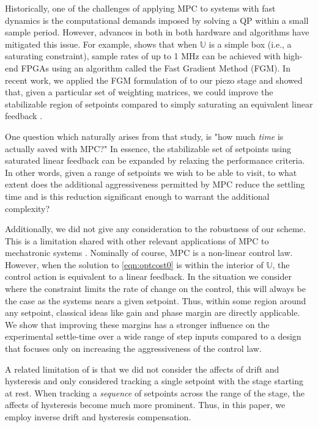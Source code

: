 \documentclass[journal,twocolumn,twoside]{IEEEtran}
\begin{document}
Historically, one of the challenges of applying MPC to systems with fast dynamics is the computational demands imposed by solving a QP within a small sample period. However, advances in both in both hardware and algorithms have mitigated this issue. For example, \cite{Jerez_Trans_2014} shows that when $\mathds{U}$ is a simple box (i.e., a saturating constraint), sample rates of up to 1 MHz can be achieved with high-end FPGAs using an algorithm called the Fast Gradient Method (FGM). In recent work, we applied the FGM formulation of \cite{Jerez_Trans_2014} to our piezo stage and showed that, given a particular set of weighting matrices, we could improve the stabilizable region of setpoints compared to simply saturating an equivalent linear feedback \cite{braker_application_2017}.

One question which naturally arises from that study, is "how much \emph{time} is actually saved with MPC?" In essence, the stabilizable set of setpoints using saturated linear feedback can be expanded by relaxing the performance criteria.
In other words, given a range of setpoints we wish to be able to visit, to what extent does the additional aggressiveness permitted by MPC reduce the settling time and is this reduction significant enough to warrant the additional complexity?


Additionally, we did not give any consideration to the robustness of our scheme. This is a limitation shared with other relevant applications of MPC to mechatronic systems \cite{Wills_CDC_2005, Lin_ASME_2012, rana_design_2014}. Nominally of course, MPC is a non-linear control law. However, when the solution to \eqref{eqn:optcost0} is within the interior of $\mathds{U}$, the control action is equivalent to a linear feedback. In the situation we consider where the constraint limits the rate of change on the control, this will always be the case as the systems nears a given setpoint. Thus, within some region around any setpoint, classical ideas like gain and phase margin are directly applicable. We show that improving these margins has a stronger influence on the experimental settle-time over a wide range of step inputs compared to a design that focuses only on increasing the aggressiveness of the control law.

A related limitation of \cite{braker_application_2017} is that we did not consider the affects of drift and hysteresis and only considered tracking a single setpoint with the stage starting at rest. When tracking a \emph{sequence} of setpoints across the range of the stage, the affects of hysteresis become much more prominent. Thus, in this paper, we employ inverse drift and hysteresis compensation.
\end{document}
